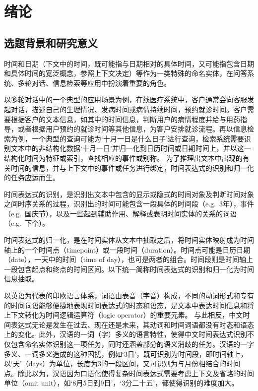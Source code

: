 
\chapter{绪论}

\section{选题背景和研究意义}

时间和日期（下文中的时间，既可能指与日期相对的具体时间，又可能指包含日期和具体时间的宽泛概念，参照上下文决定）等作为一类特殊的命名实体，在问答系统、多轮对话、信息检索等应用中扮演着重要的角色。

以多轮对话中的一个典型的应用场景为例，在线医疗系统中，客户通常会向客服发起对话，描述自己的生理情况、发病时间或病情持续时间，预约就诊时间。客户需要根据客户的文本信息，如其中的时间信息，判断用户的病情程度并给与用药指导，或者根据用户预约的就诊时间等其他信息，为客户安排就诊流程。再以信息检索为例，一个典型的查询可能为‘十月一日是什么日子’进行查询，检索系统需要识别文本中的非结构化数据‘十月一日’并归一化到日历时间或日期时间上，并以这一结构化时间为特征或索引，查找相应的事件或别称。
为了推理出文本中出现的有关时间的信息，并与上下文中的事件或任务进行绑定，时间表达式的识别和归一化的任务应运而生。

时间表达式的识别，是识别出文本中包含的显示或隐式的时间对象及判断时间对象之间时序关系的过程，识别出的时间可能包含一段具体的时间段（e.g.\ 3年），事件（e.g.\ 国庆节），以及一些起到辅助作用、解释或表明时间实体的关系的词语（e.g.\ 下个）。

时间表达式的归一化，是在时间实体从文本中抽取之后，将时间实体映射成为时间轴上的一个时间点（timepoint）或一段时间（duration）。时间点可能是日历日期（date），一天中的时间（time of day），也可是两者的组合。时间段则是时间轴上一段包含起点和终点的时间区间。以下统一简称时间表达式的识别和归一化为时间信息抽取。

以英语为代表的印欧语言体系，词语由表音（字音）构成，不同的动词形式和专有的时间词语能够便捷地表现时间表达式的时态和语态，是文本中表达时间信息和将上下文转化为时间逻辑运算符（logic operator）的重要元素。
与此相反，中文时间表达式无论是发生在过去、现在还是未来，其动词和时间词语都没有时态和语态上的变化。此外，汉语的一词（字）多义的语言特性，使得中文时间表达式识别不仅包含命名实体识别这一项任务，同时还涵盖部分的语义消歧的任务。汉语的一字多义、一词多义造成的这种困扰，例如‘3日’，既可识别为时间段，即时间轴上，以‘天’（days）为单位，长度为3的一段区间，又可识别为与月份相结合的时间点。除此以为，汉语因为口语化使得复杂时间表达式需要考虑上下文及省略的时间单位（omit unit），如‘8月5日到9日’，‘3分二十五’，都使得识别的难度加大。

